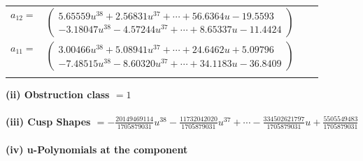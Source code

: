 \documentclass[1p]{elsarticle_modified}
\theoremstyle{definition}
\begin{document}
\begin{tabular}{m{7pt} m{180pt} m{7pt} m{180pt} }
\flushright $a_{12}=$&$\begin{pmatrix}5.65559 u^{38}+2.56831 u^{37}+\cdots+56.6364 u-19.5593\\-3.18047 u^{38}-4.57244 u^{37}+\cdots+8.65337 u-11.4424\end{pmatrix}$ \\
\flushright $a_{11}=$&$\begin{pmatrix}3.00466 u^{38}+5.08941 u^{37}+\cdots+24.6462 u+5.09796\\-7.48515 u^{38}-8.60320 u^{37}+\cdots+34.1183 u-36.8409\end{pmatrix}$\\&\end{tabular}
\flushleft \textbf{(ii) Obstruction class $= 1$}\\~\\
\flushleft \textbf{(iii) Cusp Shapes $= -\frac{20149469114}{1705879031} u^{38}-\frac{11732042020}{1705879031} u^{37}+\cdots-\frac{334502621797}{1705879031} u+\frac{5505549483}{1705879031}$}\\~\\
\newpage\renewcommand{\arraystretch}{1}
\flushleft \textbf{(iv) u-Polynomials at the component}\newline \\
\end{document}
